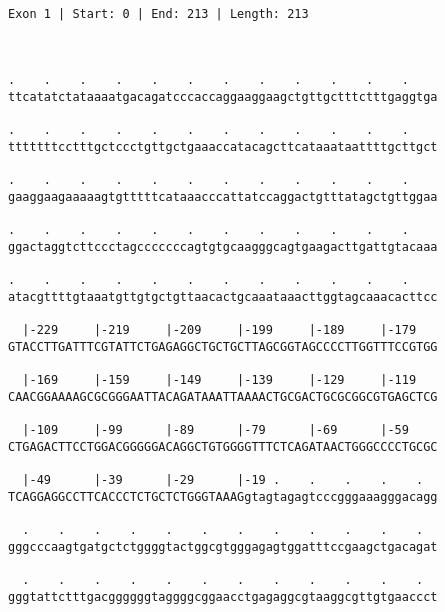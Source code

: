 \documentclass{article}
\begin{document}
 \begin{Verbatim}
 
Exon 1 | Start: 0 | End: 213 | Length: 213



.    .    .    .    .    .    .    .    .    .    .    .    
ttcatatctataaaatgacagatcccaccaggaaggaagctgttgctttctttgaggtga
                                                            
.    .    .    .    .    .    .    .    .    .    .    .    
tttttttcctttgctccctgttgctgaaaccatacagcttcataaataattttgcttgct
                                                            
.    .    .    .    .    .    .    .    .    .    .    .    
gaaggaagaaaaagtgtttttcataaacccattatccaggactgtttatagctgttggaa
                                                            
.    .    .    .    .    .    .    .    .    .    .    .    
ggactaggtcttccctagcccccccagtgtgcaagggcagtgaagacttgattgtacaaa
                                                            
.    .    .    .    .    .    .    .    .    .    .    .    
atacgttttgtaaatgttgtgctgttaacactgcaaataaacttggtagcaaacacttcc
                                                            
  |-229     |-219     |-209     |-199     |-189     |-179   
GTACCTTGATTTCGTATTCTGAGAGGCTGCTGCTTAGCGGTAGCCCCTTGGTTTCCGTGG
                                                            
  |-169     |-159     |-149     |-139     |-129     |-119   
CAACGGAAAAGCGCGGGAATTACAGATAAATTAAAACTGCGACTGCGCGGCGTGAGCTCG
                                                            
  |-109     |-99      |-89      |-79      |-69      |-59    
CTGAGACTTCCTGGACGGGGGACAGGCTGTGGGGTTTCTCAGATAACTGGGCCCCTGCGC
                                                            
  |-49      |-39      |-29      |-19 .    .    .    .    .  
TCAGGAGGCCTTCACCCTCTGCTCTGGGTAAAGgtagtagagtcccgggaaagggacagg
                                                            
  .    .    .    .    .    .    .    .    .    .    .    .  
gggcccaagtgatgctctggggtactggcgtgggagagtggatttccgaagctgacagat
                                                            
  .    .    .    .    .    .    .    .    .    .    .    .  
gggtattctttgacggggggtaggggcggaacctgagaggcgtaaggcgttgtgaaccct
                                                            

\end{Verbatim}
\end{document}
